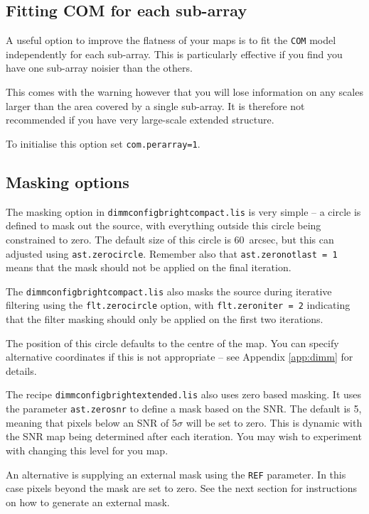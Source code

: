\documentclass[twoside,11pt]{article}
\newcommand{\xlabel}[1]{}
\renewcommand{\_}{\texttt{\symbol{95}}}
\begin{document}
\subsection{\xlabel{filter}Fitting COM for each sub-array}
\label{sec:com}

A useful option to improve the flatness of your maps is to fit the
\texttt{COM} model independently for each sub-array. This is
particularly effective if you find you have one sub-array noisier than
the others.

This comes with the warning however that you will lose information on
any scales larger than the area covered by a single sub-array. It is
therefore not recommended if you have very large-scale extended
structure.

To initialise this option set \texttt{com.perarray=1}.


\subsection{\xlabel{mask}Masking options}
\label{sec:mask}

The masking option in \texttt{dimmconfig\_bright\_compact.lis} is very
simple -- a circle is defined to mask out the source, with everything
outside this circle being constrained to zero. The default size of
this circle is 60~arcsec, but this can adjusted using
\texttt{ast.zero\_circle}. Remember also that
\texttt{ast.zero\_notlast = 1} means that the mask should not be
applied on the final iteration.

The \texttt{dimmconfig\_bright\_compact.lis} also masks the source
during iterative filtering using the \texttt{flt.zero\_circle} option,
with \texttt{flt.zero\_niter = 2} indicating that the filter masking
should only be applied on the first two iterations.

The position of this circle defaults to the centre of the map. You can
specify alternative coordinates if this is not appropriate -- see
Appendix \ref{app:dimm} for details.

The recipe \texttt{dimmconfig\_bright\_extended.lis} also uses zero
based masking. It uses the parameter \texttt{ast.zero\_snr} to define
a mask based on the SNR. The default is 5, meaning that pixels below an
SNR of 5$\sigma$ will be set to zero. This is dynamic with the SNR map
being determined after each iteration. You may wish to experiment with
changing this level for you map.

An alternative is supplying an external mask using the \texttt{REF}
parameter. In this case pixels beyond the mask are set to zero. See
the next section for instructions on how to generate an external mask.
\end{document}
